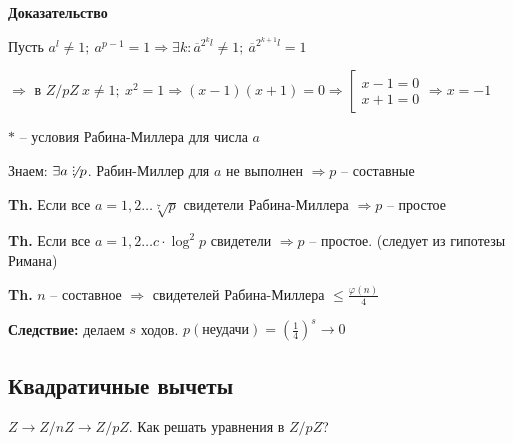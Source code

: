 \documentclass[14pt, letter paper]{article}
\def\divby{%
  \mathrel{\text{\vbox{\baselineskip.65ex\lineskiplimit0pt\hbox{.}\hbox{.}\hbox{.}}}}%
}
\begin{document}
\begin{center}
    \textbf{Доказательство}
\end{center}

Пусть $a^l \neq 1;\ a^{p-1} = 1 \Rightarrow \exists k : \overline{a}^{2^kl} \neq 1;\ \overline{a}^{2^{k+1}l} = 1$

$\Rightarrow$ в $Z/pZ\ x \neq 1;\ x^2 = 1 \Rightarrow (x-1)(x+1) = 0 \Rightarrow \left[ \begin{gathered}
    x - 1 = 0 \\
    x + 1 = 0
\end{gathered} \right. \Rightarrow x = -1$

$*$ -- условия Рабина-Миллера для числа $a$

Знаем: $\exists a \not\divby p$. Рабин-Миллер для $a$ не выполнен $\Rightarrow p$ -- составные

\vspace{5mm}

\textbf{Th.} Если все $a = 1, 2 \ldots \sqrt[7]{p}$ свидетели Рабина-Миллера $\Rightarrow p$ -- простое

\textbf{Th.} Если все $a = 1, 2 \ldots c \cdot \log^2{p}$ свидетели $\Rightarrow p$ -- простое. (следует из гипотезы Римана)

\textbf{Th.} $n$ -- составное $\Rightarrow$ свидетелей Рабина-Миллера $\leq \frac{\varphi(n)}{4}$

\textbf{Следствие:} делаем $s$ ходов. $p(\text{неудачи}) = (\frac{1}{4})^s \rightarrow 0$

\begin{center}
    \section*{Квадратичные вычеты}
\end{center}

$Z \rightarrow Z/nZ \rightarrow Z/pZ$. Как решать уравнения в $Z/pZ$?
\end{document}
